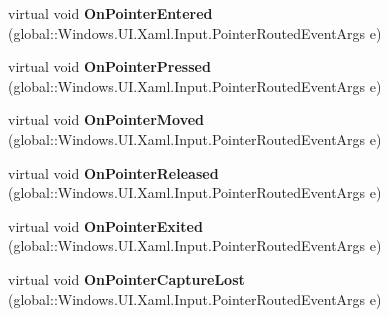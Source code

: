 \begin{DoxyCompactItemize}
\item 
\mbox{\label{class_windows_1_1_u_i_1_1_xaml_1_1_controls_1_1_control_ae3e99583865513e0de94e3c419b26924}} 
virtual void {\bfseries On\+Pointer\+Entered} (global\+::\+Windows.\+U\+I.\+Xaml.\+Input.\+Pointer\+Routed\+Event\+Args e)
\item 
\mbox{\label{class_windows_1_1_u_i_1_1_xaml_1_1_controls_1_1_control_a72d13df130e7f9b6c8cc7fbbf022be49}} 
virtual void {\bfseries On\+Pointer\+Pressed} (global\+::\+Windows.\+U\+I.\+Xaml.\+Input.\+Pointer\+Routed\+Event\+Args e)
\item 
\mbox{\label{class_windows_1_1_u_i_1_1_xaml_1_1_controls_1_1_control_ae671c763ce297220751cee1945c9265b}} 
virtual void {\bfseries On\+Pointer\+Moved} (global\+::\+Windows.\+U\+I.\+Xaml.\+Input.\+Pointer\+Routed\+Event\+Args e)
\item 
\mbox{\label{class_windows_1_1_u_i_1_1_xaml_1_1_controls_1_1_control_a1a16d49c087d495de68e1f9953a4ebfd}} 
virtual void {\bfseries On\+Pointer\+Released} (global\+::\+Windows.\+U\+I.\+Xaml.\+Input.\+Pointer\+Routed\+Event\+Args e)
\item 
\mbox{\label{class_windows_1_1_u_i_1_1_xaml_1_1_controls_1_1_control_a57ecaf6968ada920336dd8afd70ad576}} 
virtual void {\bfseries On\+Pointer\+Exited} (global\+::\+Windows.\+U\+I.\+Xaml.\+Input.\+Pointer\+Routed\+Event\+Args e)
\item 
\mbox{\label{class_windows_1_1_u_i_1_1_xaml_1_1_controls_1_1_control_a2f9ad5125fbed9d126ebcfd2b0fe794c}} 
virtual void {\bfseries On\+Pointer\+Capture\+Lost} (global\+::\+Windows.\+U\+I.\+Xaml.\+Input.\+Pointer\+Routed\+Event\+Args e)
\item 
\mbox{\label{class_windows_1_1_u_i_1_1_xaml_1_1_controls_1_1_control_a94fec4012722a7b1310cbc30233b7940}} 

\end{DoxyCompactItemize}
